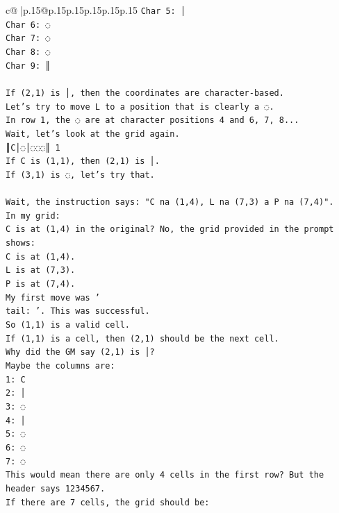 \documentclass{article}
\begin{document}
{\begin{supertabular}{c@{$\;$}|p{.15\linewidth}@{}p{.15\linewidth}p{.15\linewidth}p{.15\linewidth}p{.15\linewidth}p{.15\linewidth}}
{{{\texttt{Char 5: │} \\
\texttt{Char 6: ◌} \\
\texttt{Char 7: ◌} \\
\texttt{Char 8: ◌} \\
\texttt{Char 9: ║} \\
\\ 
\texttt{If (2,1) is │, then the coordinates are character{-}based.} \\
\texttt{Let's try to move L to a position that is clearly a ◌.} \\
\texttt{In row 1, the ◌ are at character positions 4 and 6, 7, 8...} \\
\texttt{Wait, let's look at the grid again.} \\
\texttt{║C│◌│◌◌◌║ 1} \\
\texttt{If C is (1,1), then (2,1) is │.} \\
\texttt{If (3,1) is ◌, let's try that.} \\
\\ 
\texttt{Wait, the instruction says: "C na (1,4), L na (7,3) a P na (7,4)".} \\
\texttt{In my grid:} \\
\texttt{C is at (1,4) in the original? No, the grid provided in the prompt shows:} \\
\texttt{C is at (1,4).} \\
\texttt{L is at (7,3).} \\
\texttt{P is at (7,4).} \\
\texttt{My first move was '} \\
\texttt{tail: '. This was successful.} \\
\texttt{So (1,1) is a valid cell.} \\
\texttt{If (1,1) is a cell, then (2,1) should be the next cell.} \\
\texttt{Why did the GM say (2,1) is │?} \\
\texttt{Maybe the columns are:} \\
\texttt{1: C} \\
\texttt{2: │} \\
\texttt{3: ◌} \\
\texttt{4: │} \\
\texttt{5: ◌} \\
\texttt{6: ◌} \\
\texttt{7: ◌} \\
\texttt{This would mean there are only 4 cells in the first row? But the header says 1234567.} \\
\texttt{If there are 7 cells, the grid should be:} \\
}}}
\end{supertabular}}
\end{document}
